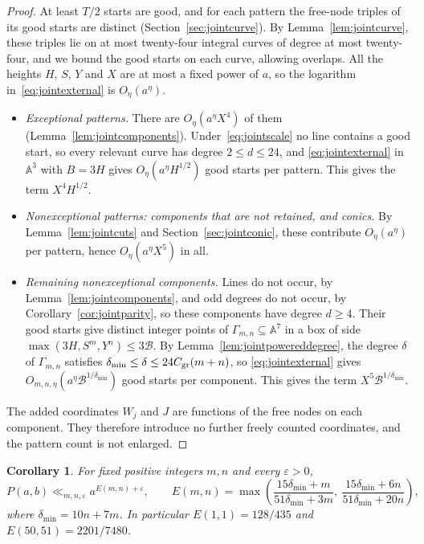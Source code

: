 \documentclass[11pt]{article}
\newtheorem{corollary}[theorem]{Corollary}
\theoremstyle{definition}
\theoremstyle{remark}
\begin{document}
\begin{proof}
At least $T/2$ starts are good, and for each pattern the free-node triples of
its good starts are distinct (Section~\ref{sec:jointcurve}). By
Lemma~\ref{lem:jointcurve}, these triples lie on at most twenty-four integral
curves of degree at most twenty-four, and we bound the good starts on each
curve, allowing overlaps. All the heights $H$, $S$, $Y$ and $X$ are at most a fixed
power of $a$, so the logarithm in~\eqref{eq:jointexternal} is $O_\eta(a^\eta)$.
\begin{itemize}
\item \emph{Exceptional patterns.} There are $O_\eta(a^\eta X^4)$ of them
(Lemma~\ref{lem:jointcomponents}). Under~\eqref{eq:jointscale} no line
contains a good start, so every relevant curve has degree $2\le d\le24$, and
\eqref{eq:jointexternal} in $\mathbb A^3$ with $B=3H$ gives $O_\eta(a^\eta H^{1/2})$
good starts per pattern. This gives the term $X^4H^{1/2}$.
\item \emph{Nonexceptional patterns: components that are not retained, and
conics.} By Lemma~\ref{lem:jointcuts} and Section~\ref{sec:jointconic},
these contribute $O_\eta(a^\eta)$ per pattern, hence $O_\eta(a^\eta X^5)$ in all.
\item \emph{Remaining nonexceptional components.} Lines do not
occur, by Lemma~\ref{lem:jointcomponents}, and odd degrees do not occur, by
Corollary~\ref{cor:jointparity}, so these components have degree $d\ge4$.
Their good starts give distinct integer points of $\Gamma_{m,n}\subseteq\mathbb A^7$ in a box of
side $\max(3H,S^m,Y^n)\le3\mathcal B$. By Lemma~\ref{lem:jointpowereddegree}, the degree
$\delta$ of $\Gamma_{m,n}$ satisfies $\delta_{\min}\le\delta\le24C_{\rm gr}(m+n)$, so
\eqref{eq:jointexternal} gives $O_{m,n,\eta}(a^\eta\mathcal B^{1/\delta_{\min}})$
good starts per component. This gives the term $X^5\mathcal B^{1/\delta_{\min}}$.
\end{itemize}
The added coordinates $W_j$ and $J$ are functions of the free nodes on each
component. They therefore introduce no further freely counted coordinates, and
the pattern count is not enlarged.
\end{proof}

\begin{corollary}\label{cor:jointexponent}
For fixed positive integers $m,n$ and every $\varepsilon>0$,
\[
 P(a,b)\ll_{m,n,\varepsilon}a^{E(m,n)+\varepsilon},\qquad
 E(m,n)=\max\left(\frac{15\delta_{\min}+m}{51\delta_{\min}+3m},\
           \frac{15\delta_{\min}+6n}{51\delta_{\min}+20n}\right),
\]
where $\delta_{\min}=10n+7m$. In particular $E(1,1)=128/435$ and
$E(50,51)=2201/7480$.
\end{corollary}
\end{document}
